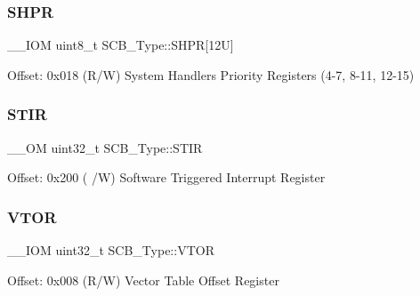 \subsubsection{\texorpdfstring{S\+H\+PR}{SHPR}\hspace{0.1cm}{\footnotesize\ttfamily [2/2]}}
{\footnotesize\ttfamily \+\_\+\+\_\+\+I\+OM uint8\+\_\+t S\+C\+B\+\_\+\+Type\+::\+S\+H\+PR\mbox{[}12\+U\mbox{]}}

Offset\+: 0x018 (R/W) System Handlers Priority Registers (4-\/7, 8-\/11, 12-\/15) \mbox{\label{struct_s_c_b___type_ad70825dd0869b7ccd07fb2b8680fcdb6}} 
\subsubsection{\texorpdfstring{S\+T\+IR}{STIR}}
{\footnotesize\ttfamily \+\_\+\+\_\+\+OM uint32\+\_\+t S\+C\+B\+\_\+\+Type\+::\+S\+T\+IR}

Offset\+: 0x200 ( /W) Software Triggered Interrupt Register \mbox{\label{struct_s_c_b___type_a187a4578e920544ed967f98020fb8170}} 
\subsubsection{\texorpdfstring{V\+T\+OR}{VTOR}}
{\footnotesize\ttfamily \+\_\+\+\_\+\+I\+OM uint32\+\_\+t S\+C\+B\+\_\+\+Type\+::\+V\+T\+OR}

Offset\+: 0x008 (R/W) Vector Table Offset Register 


